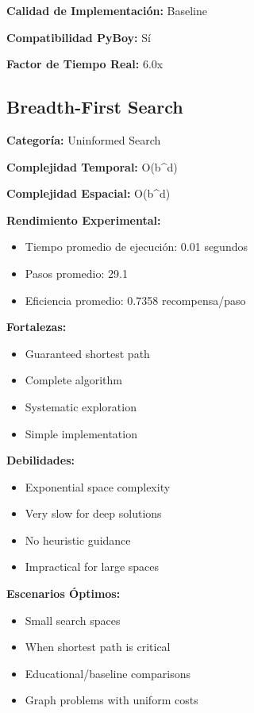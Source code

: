 \textbf{Calidad de Implementación:} Baseline

\textbf{Compatibilidad PyBoy:} Sí

\textbf{Factor de Tiempo Real:} 6.0x



\subsection{Breadth-First Search}

\textbf{Categoría:} Uninformed Search

\textbf{Complejidad Temporal:} O(b^d)

\textbf{Complejidad Espacial:} O(b^d)

\textbf{Rendimiento Experimental:}
\begin{itemize}
    \item Tiempo promedio de ejecución: 0.01 segundos
    \item Pasos promedio: 29.1
    \item Eficiencia promedio: 0.7358 recompensa/paso
\end{itemize}

\textbf{Fortalezas:}
\begin{itemize}
    \item Guaranteed shortest path
    \item Complete algorithm
    \item Systematic exploration
    \item Simple implementation
\end{itemize}

\textbf{Debilidades:}
\begin{itemize}
    \item Exponential space complexity
    \item Very slow for deep solutions
    \item No heuristic guidance
    \item Impractical for large spaces
\end{itemize}

\textbf{Escenarios Óptimos:}
\begin{itemize}
    \item Small search spaces
    \item When shortest path is critical
    \item Educational/baseline comparisons
    \item Graph problems with uniform costs
\end{itemize}

